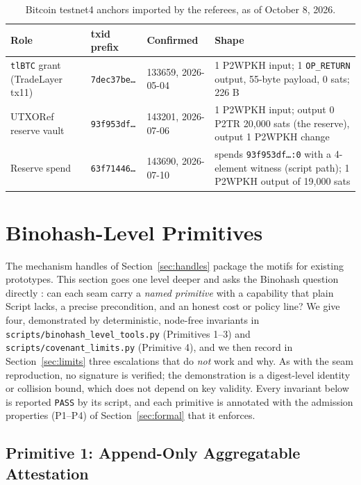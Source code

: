 \documentclass[11pt]{article}
\begin{document}
\begin{table}[t]
\centering
\small
\begin{tabular}{L{2.6cm}L{2.4cm}L{2.6cm}L{6.0cm}}
\toprule
Role & txid prefix & Confirmed & Shape \\
\midrule
\texttt{tlBTC} grant (TradeLayer tx11) & \texttt{7dec37be\ldots} & 133659, 2026-05-04 & 1 P2WPKH input; 1 \texttt{OP\_RETURN} output, 55-byte payload, 0 sats; 226 B \\
UTXORef reserve vault & \texttt{93f953df\ldots} & 143201, 2026-07-06 & 1 P2WPKH input; output 0 P2TR 20{,}000 sats (the reserve), output 1 P2WPKH change \\
Reserve spend & \texttt{63f71446\ldots} & 143690, 2026-07-10 & spends \texttt{93f953df\ldots:0} with a 4-element witness (script path); 1 P2WPKH output of 19{,}000 sats \\
\bottomrule
\end{tabular}
\caption{Bitcoin testnet4 anchors imported by the referees, as of October 8, 2026.}
\label{tab:anchors}
\end{table}

\section{Binohash-Level Primitives}
\label{sec:primitives}

The mechanism handles of Section~\ref{sec:handles} package the motifs for
existing prototypes. This section goes one level deeper and asks the Binohash
question directly \cite{linus2026binohash}: can each seam carry a
\emph{named primitive} with a capability that plain Script lacks, a precise
precondition, and an honest cost or policy line? We give four, demonstrated by
deterministic, node-free invariants in
\texttt{scripts/binohash\_level\_tools.py} (Primitives 1--3) and
\texttt{scripts/covenant\_limits.py} (Primitive 4), and we then record in
Section~\ref{sec:limits} three escalations that do \emph{not} work and why. As
with the seam reproduction, no signature is verified; the demonstration is a
digest-level identity or collision bound, which does not depend on key validity.
Every invariant below is reported \texttt{PASS} by its script, and each
primitive is annotated with the admission properties (P1--P4) of
Section~\ref{sec:formal} that it enforces.

\subsection{Primitive 1: Append-Only Aggregatable Attestation}
\end{document}
